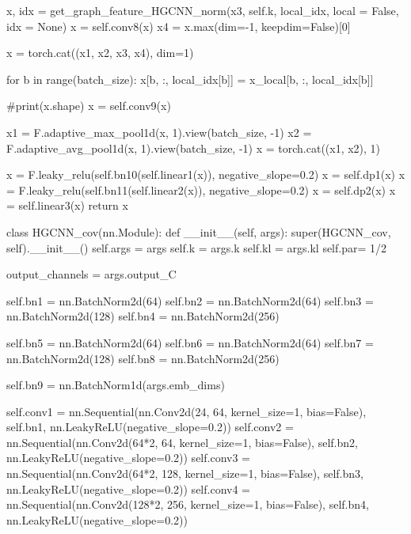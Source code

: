         x, idx = get_graph_feature_HGCNN_norm(x3, self.k, local_idx, local = False, idx = None)
        x = self.conv8(x)
        x4 = x.max(dim=-1, keepdim=False)[0]

        x = torch.cat((x1, x2, x3, x4), dim=1)
        
        for b in range(batch_size):
            x[b, :, local_idx[b]] = x_local[b, :, local_idx[b]]
        
        #print(x.shape)
        x = self.conv9(x)
        
        x1 = F.adaptive_max_pool1d(x, 1).view(batch_size, -1)
        x2 = F.adaptive_avg_pool1d(x, 1).view(batch_size, -1)
        x = torch.cat((x1, x2), 1)
        
        
        x = F.leaky_relu(self.bn10(self.linear1(x)), negative_slope=0.2)
        x = self.dp1(x)
        x = F.leaky_relu(self.bn11(self.linear2(x)), negative_slope=0.2)
        x = self.dp2(x)
        x = self.linear3(x)
        return x









class HGCNN_cov(nn.Module):
    def __init__(self, args):
        super(HGCNN_cov, self).__init__()
        self.args = args
        self.k = args.k
        self.kl = args.kl
        self.par= 1/2
        
        output_channels = args.output_C
        
        self.bn1 = nn.BatchNorm2d(64)
        self.bn2 = nn.BatchNorm2d(64)
        self.bn3 = nn.BatchNorm2d(128)
        self.bn4 = nn.BatchNorm2d(256)
        
        self.bn5 = nn.BatchNorm2d(64)
        self.bn6 = nn.BatchNorm2d(64)
        self.bn7 = nn.BatchNorm2d(128)
        self.bn8 = nn.BatchNorm2d(256)
                
        self.bn9 = nn.BatchNorm1d(args.emb_dims)

        self.conv1 = nn.Sequential(nn.Conv2d(24, 64, kernel_size=1, bias=False),
                                   self.bn1,
                                   nn.LeakyReLU(negative_slope=0.2))
        self.conv2 = nn.Sequential(nn.Conv2d(64*2, 64, kernel_size=1, bias=False),
                                   self.bn2,
                                   nn.LeakyReLU(negative_slope=0.2))
        self.conv3 = nn.Sequential(nn.Conv2d(64*2, 128, kernel_size=1, bias=False),
                                   self.bn3,
                                   nn.LeakyReLU(negative_slope=0.2))
        self.conv4 = nn.Sequential(nn.Conv2d(128*2, 256, kernel_size=1, bias=False),
                                   self.bn4,
                                   nn.LeakyReLU(negative_slope=0.2))
        
